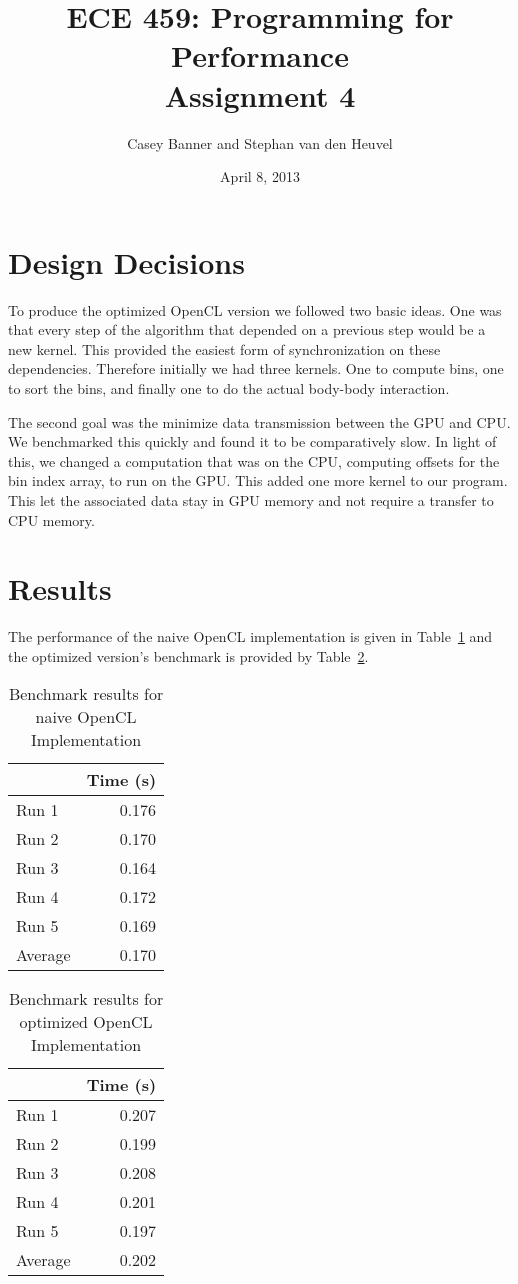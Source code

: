 \documentclass[12pt]{article}
\title{ECE 459: Programming for Performance\\Assignment 4}
\author{Casey Banner and Stephan van den Heuvel}
\date{April 8, 2013}
\begin{document}
\maketitle

\section{Design Decisions}
To produce the optimized OpenCL version we followed two basic ideas. One was that every 
step of the algorithm
that depended on a previous step would be a new kernel. This provided the easiest form of 
synchronization on
these dependencies. Therefore initially we had three kernels. One to compute bins, one to 
sort the bins, and 
finally one to do the actual body-body interaction.

The second goal was the minimize data transmission between the GPU and CPU. We 
benchmarked this quickly and
found it to be comparatively slow. In light of this, we changed a computation that was on 
the CPU, computing
offsets for the bin index array, to run on the GPU. This added one more kernel to our 
program. This let the associated data stay in GPU memory and not require a transfer to 
CPU memory.

\section{Results}

The performance of the naive OpenCL implementation is given in
Table~\ref{tbl-naive-bench} and the optimized version's benchmark is
provided by Table~\ref{tbl-opt-bench}.

\begin{table}[H]
  \centering
  \begin{tabular}{lr}
    & {\bf Time (s)} \\
    \hline
    Run 1 & 0.176 \\
    Run 2 & 0.170 \\
    Run 3 & 0.164 \\
    Run 4 & 0.172 \\
    Run 5 & 0.169 \\
    \hline
    Average & 0.170 \\
  \end{tabular}
  \caption{Benchmark results for naive OpenCL Implementation}
  \label{tbl-naive-bench}
\end{table}

\begin{table}[H]
  \centering
  \begin{tabular}{lr}
    & {\bf Time (s)} \\
    \hline
    Run 1 & 0.207 \\
    Run 2 & 0.199 \\
    Run 3 & 0.208 \\
    Run 4 & 0.201 \\
    Run 5 & 0.197 \\
    \hline
    Average & 0.202 \\
  \end{tabular}
  \caption{Benchmark results for optimized OpenCL Implementation}
  \label{tbl-opt-bench}
\end{table}
\end{document}
